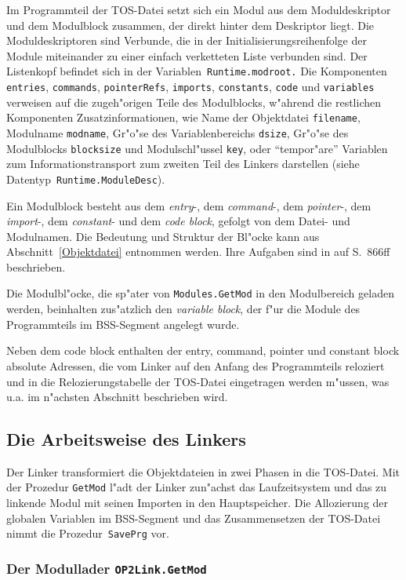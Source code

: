 \medskip
Im Programmteil der TOS-Datei setzt sich ein Modul aus dem Moduldeskriptor
und dem Modulblock zusammen, der direkt hinter dem Deskriptor liegt.
Die Moduldeskriptoren sind Verbunde, die in der Initialisierungsreihenfolge
der Module miteinander zu einer einfach verketteten Liste verbunden sind.
Der Listenkopf befindet sich in der Variablen~{\tt Runtime.modroot.}
Die Komponenten {\tt entries}, {\tt commands}, {\tt pointerRefs},
{\tt imports}, {\tt constants}, {\tt code} und {\tt variables}
verweisen auf die zugeh"origen Teile des Modulblocks, w"ahrend die
restlichen Komponenten Zusatzinformationen, wie Name der Objektdatei {\tt filename},
Modulname {\tt modname}, Gr"o"se des Variablenbereichs {\tt dsize},
Gr"o"se des Modulblocks {\tt blocksize} und Modulschl"ussel {\tt key},
oder "`tempor"are"' Variablen zum Informationstransport zum zweiten Teil
des Linkers darstellen (siehe Datentyp~{\tt Runtime.ModuleDesc}).

Ein Modulblock besteht aus dem {\it entry\/}-, dem {\it command\/}-,
dem {\it pointer\/}-, dem {\it import\/}-, dem {\it constant\/}- und dem
{\it code block}, gefolgt von dem Datei- und Modulnamen.
Die Bedeutung und Struktur der Bl"ocke kann aus Abschnitt~\ref{Objektdatei}
entnommen werden.
Ihre Aufgaben sind in \cite{oberonSystem} auf S.~866ff beschrieben.

Die Modulbl"ocke, die sp"ater von {\tt Modules.GetMod} in den Modulbereich geladen
werden, beinhalten zus"atzlich den {\it variable block}, der f"ur die
Module des Programmteils im BSS-Segment angelegt wurde.

Neben dem code block enthalten der entry, command, pointer und constant block
absolute Adressen, die vom Linker auf den Anfang des Programmteils reloziert
und in die Relozierungstabelle der TOS-Datei eingetragen werden m"ussen, was
u.a. im n"achsten Abschnitt beschrieben wird.


\subsection{Die Arbeitsweise des Linkers}

Der Linker transformiert die Objektdateien in zwei Phasen in die TOS-Datei.
Mit der Prozedur {\tt GetMod} l"adt der Linker zun"achst das Laufzeitsystem
und das zu linkende Modul mit seinen Importen in den Hauptspeicher.
Die Allozierung der globalen Variablen im BSS-Segment und das Zusammensetzen
der TOS-Datei nimmt die Prozedur~{\tt SavePrg} vor.

\subsubsection{Der Modullader {\tt OP2Link.GetMod}}
\label{GetMod}

